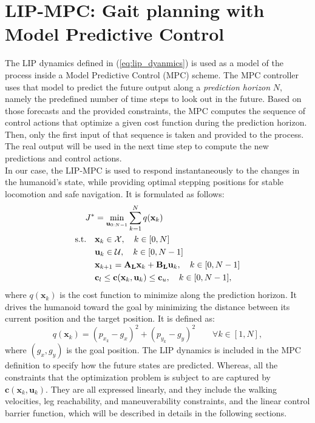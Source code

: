 \section{LIP-MPC: Gait planning with Model Predictive Control}\label{sec:mpc}
The LIP dynamics defined in (\ref{eq:lip_dyanmics}) is used as a model of the process inside a Model Predictive Control (MPC) scheme. The MPC controller uses that model to predict the future output along a \textit{prediction horizon} $N$, namely the predefined number of time steps to look out in the future. Based on those forecasts and the provided constraints, the MPC computes the sequence of control actions that optimize a given cost function during the prediction horizon. Then, only the first input of that sequence is taken and provided to the process. The real output will be used in the next time step to compute the new predictions and control actions.\\
In our case, the LIP-MPC is used to respond instantaneously to the changes in the humanoid's state, while providing optimal stepping positions for stable locomotion and safe navigation. It is formulated as follows:
\begin{align}
    J^* &= \min_{\mathbf{u}_{0:N-1}} \sum_{k=1}^{N} q(\mathbf{x}_k) \\
    \text{s.t.} \quad
    &\mathbf{x}_k \in \mathcal{X}, \quad k \in [0, N] \notag \\
    &\mathbf{u}_k \in \mathcal{U}, \quad k \in [0, N-1] \notag \\
    &\mathbf{x}_{k+1} = \mathbf{A_L} \mathbf{x}_k + \mathbf{B_L} \mathbf{u}_k, \quad k \in [0, N-1] \notag \\
    &\mathbf{c}_l \leq \mathbf{c}(\mathbf{x}_k, \mathbf{u}_k) \leq \mathbf{c}_u, \quad k \in [0, N-1], \notag
    \label{eq:lip-mpc}
\end{align}
where $q(\mathbf{x}_k)$ is the cost function to minimize along the prediction horizon. It drives the humanoid toward the goal by minimizing the distance between its current position and the target position. It is defined as:
$$
q(\mathbf{x}_k) = \left( p_{x_k} - g_x \right)^2 + \left( p_{y_k} - g_y \right)^2 \qquad \forall k \in \left[1, N\right],
$$
where $(g_x, g_y)$ is the goal position. The LIP dynamics is included in the MPC definition to specify how the future states are predicted. Whereas, all the constraints that the optimization problem is subject to are captured by $\mathbf{c}(\mathbf{x}_k, \mathbf{u}_k)$. They are all expressed linearly, and they include the walking velocities, leg reachability, and maneuverability constraints, and the linear control barrier function, which will be described in details in the following sections.

